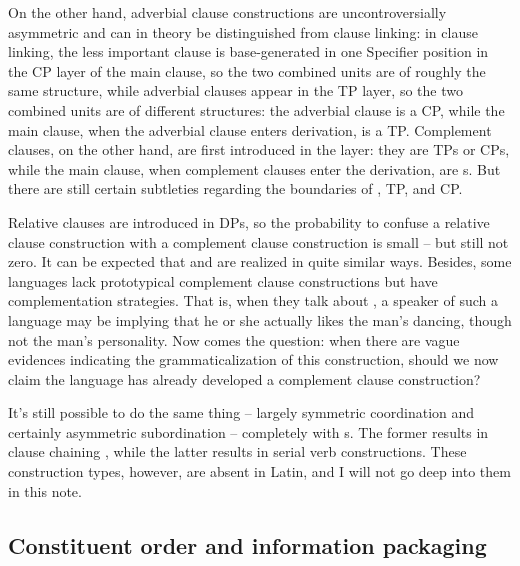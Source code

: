 {On the other hand, adverbial clause constructions 
are uncontroversially asymmetric and can in theory be distinguished from clause linking:
in clause linking, the less important clause 
is base-generated in one Specifier position in the CP layer of the main clause,
so the two combined units are of roughly the same structure,
while adverbial clauses appear in the TP layer,
so the two combined units are of different structures:
the adverbial clause is a CP,
while the main clause, when the adverbial clause enters derivation,
is a TP.
Complement clauses, on the other hand, are first introduced in the \vP{} layer:
they are TPs or CPs,
while the main clause, when complement clauses enter the derivation,
are \vP s.
But there are still certain subtleties regarding the boundaries of \vP{}, TP, and CP.

Relative clauses are introduced in DPs, 
so the probability to confuse a relative clause construction 
with a complement clause construction is small -- but still not zero.
It can be expected that  and  
are realized in quite similar ways.
Besides, some languages lack prototypical complement clause constructions 
but have complementation strategies.
That is, when they talk about ,
a speaker of such a language may be implying that he or she actually likes the man's dancing,
though not the man's personality.
Now comes the question:
when there are vague evidences indicating the grammaticalization of this construction,
should we now claim the language has already developed a complement clause construction?

It's still possible to do the same thing 
-- largely symmetric coordination and certainly asymmetric subordination -- 
completely with \vP s.
The former results in clause chaining \citep{nonato2014clause},
while the latter results in serial verb constructions.
These construction types, however, are absent in Latin, and I will not go deep into them in this note.

\subsection{Constituent order and information packaging}

}
